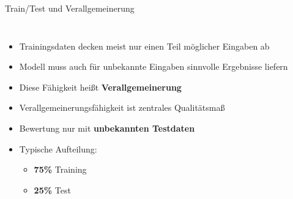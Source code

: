 

\begin{frame}{Train/Test und Verallgemeinerung}
\begin{columns}
\begin{itemize}
    \item Trainingsdaten decken meist nur einen Teil möglicher Eingaben ab
    \item Modell muss auch für unbekannte Eingaben sinnvolle Ergebnisse liefern
    \item Diese Fähigkeit heißt \textbf{Verallgemeinerung}
    \item Verallgemeinerungsfähigkeit ist zentrales Qualitätsmaß
    \item Bewertung nur mit \textbf{unbekannten Testdaten}
    \item Typische Aufteilung:
    \begin{itemize}
    \item \textbf{75\%} Training
    \item \textbf{25\%} Test
\end{itemize}
\end{itemize}


\end{columns}
\end{frame}



